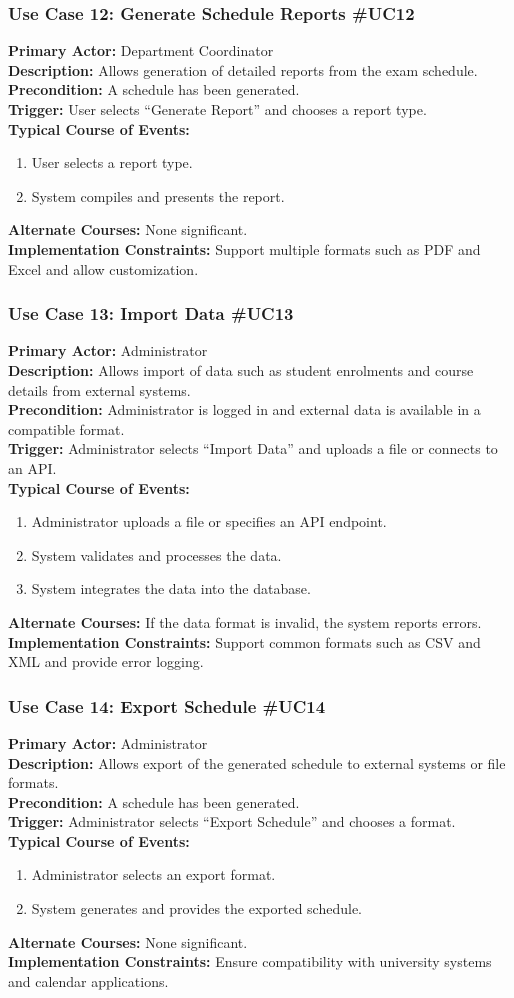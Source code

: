\documentclass[11pt]{report}
\newcommand{\usecase}[8]{%
\subsubsection*{#1}
\textbf{Primary Actor:} #2\\
\textbf{Description:} #3\\
\textbf{Precondition:} #4\\
\textbf{Trigger:} #5\\
\textbf{Typical Course of Events:}
\begin{enumerate}
#6
\end{enumerate}
\textbf{Alternate Courses:} #7\\
\textbf{Implementation Constraints:} #8
}
\begin{document}
\usecase{Use Case 12: Generate Schedule Reports \#UC12}{Department Coordinator}{Allows generation of detailed reports from the exam schedule.}{A schedule has been generated.}{User selects \textquotedblleft Generate Report\textquotedblright{} and chooses a report type.}{\item User selects a report type.\item System compiles and presents the report.}{None significant.}{Support multiple formats such as PDF and Excel and allow customization.}

\usecase{Use Case 13: Import Data \#UC13}{Administrator}{Allows import of data such as student enrolments and course details from external systems.}{Administrator is logged in and external data is available in a compatible format.}{Administrator selects \textquotedblleft Import Data\textquotedblright{} and uploads a file or connects to an API.}{\item Administrator uploads a file or specifies an API endpoint.\item System validates and processes the data.\item System integrates the data into the database.}{If the data format is invalid, the system reports errors.}{Support common formats such as CSV and XML and provide error logging.}

\usecase{Use Case 14: Export Schedule \#UC14}{Administrator}{Allows export of the generated schedule to external systems or file formats.}{A schedule has been generated.}{Administrator selects \textquotedblleft Export Schedule\textquotedblright{} and chooses a format.}{\item Administrator selects an export format.\item System generates and provides the exported schedule.}{None significant.}{Ensure compatibility with university systems and calendar applications.}
\end{document}

